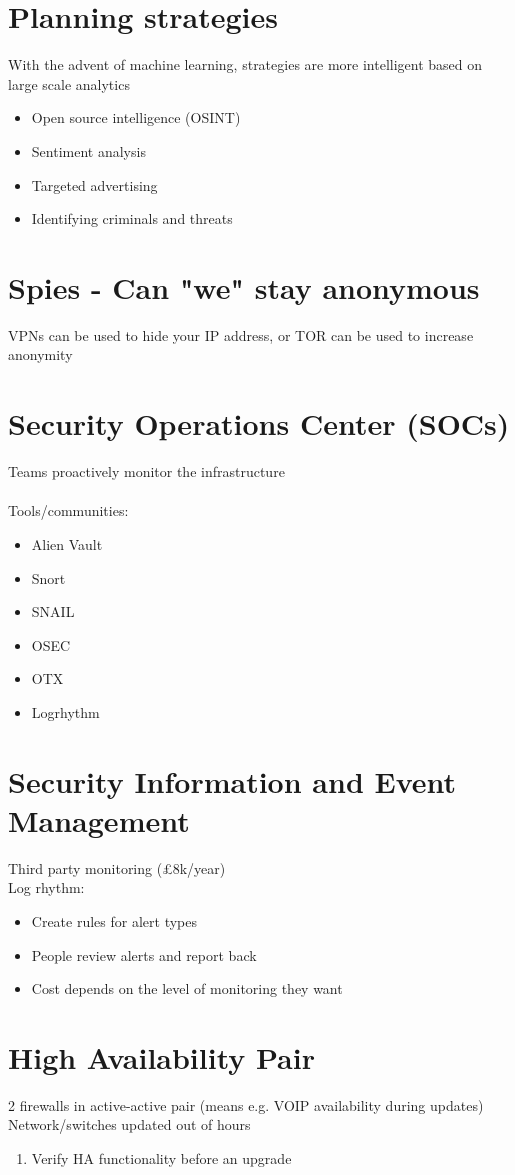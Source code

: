 \documentclass{article}[18pt]
\begin{document}
\section{Planning strategies}
With the advent of machine learning, strategies are more intelligent based on large scale analytics
\begin{itemize}
	\item Open source intelligence (OSINT)
	\item Sentiment analysis
	\item Targeted advertising
	\item Identifying criminals and threats
\end{itemize}
\section{Spies - Can "we" stay anonymous}
VPNs can be used to hide your IP address, or TOR can be used to increase anonymity
\section{Security Operations Center (SOCs)}
Teams proactively monitor the infrastructure\\
\\
Tools/communities:
\begin{itemize}
	\item Alien Vault
	\item Snort
	\item SNAIL
	\item OSEC
	\item OTX
	\item Logrhythm
\end{itemize}
\section{Security Information and Event Management}
Third party monitoring (£8k/year)\\
Log rhythm:
\begin{itemize}
	\item Create rules for alert types
	\item People review alerts and report back
	\item Cost depends on the level of monitoring they want
\end{itemize}
\section{High Availability Pair}
2 firewalls in active-active pair (means e.g. VOIP availability during updates) Network/switches updated out of hours
\begin{enumerate}
	\item Verify HA functionality before an upgrade
\end{enumerate}
\end{document}
